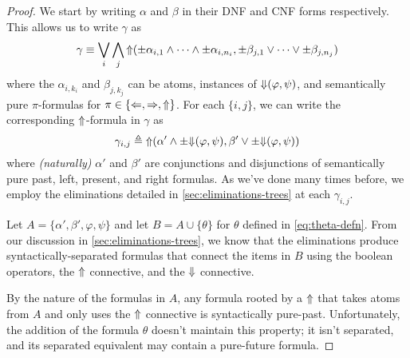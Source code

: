 \documentclass[a4paper,UKenglish,cleveref, autoref, thm-restate, numberwithinsect]{lipics-v2021}
\def\Larrow{\ensuremath\mathord{\Leftarrow}}
\def\Rarrow{\ensuremath\mathord{\Rightarrow}}
\def\Uarrow{\ensuremath\mathord{\Uparrow}}
\def\Darrow{\ensuremath\mathord{\Downarrow}}
\begin{document}
\begin{proof}
    We start by writing $\alpha$ and $\beta$ in their DNF and CNF forms respectively. This allows us to write $\gamma$ as
    \begin{equation*}
        \gamma \equiv \bigvee_i \bigwedge_j \Uarrow( \pm \alpha_{i, 1} \land \cdots \land \pm \alpha_{i, n_i}, \pm \beta_{j, 1} \lor \cdots \lor \pm \beta_{j, n_j})
    \end{equation*}
    where the $\alpha_{i, k_i}$ and $\beta_{j, k_j}$ can be atoms, instances of $\Darrow(\varphi, \psi)$, and semantically pure $\pi$-formulas for $\pi \in \{\Larrow, \Rarrow, \Uarrow\}$. For each $\{i, j\}$, we can write the corresponding $\Uarrow$-formula in $\gamma$ as
    \begin{equation*}
        \gamma_{i, j} \triangleq \Uarrow(\alpha' \land \pm \Darrow(\varphi, \psi), \beta' \lor \pm \Darrow(\varphi, \psi))
    \end{equation*}
    where \textit{(naturally)} $\alpha'$ and $\beta'$ are conjunctions and disjunctions of semantically pure past, left, present, and right formulas. As we've done many times before, we employ the eliminations detailed in \cref{sec:eliminations-trees} at each $\gamma_{i, j}$.

    Let $A = \{\alpha', \beta', \varphi, \psi\}$ and let $B = A \cup \{\theta\}$ for $\theta$ defined in \cref{eq:theta-defn}. From our discussion in \cref{sec:eliminations-trees}, we know that the eliminations produce syntactically-separated formulas that connect the items in $B$ using the boolean operators, the $\Uarrow$ connective, and the $\Darrow$ connective.

    By the nature of the formulas in $A$, any formula rooted by a $\Uarrow$ that takes atoms from $A$ and only uses the $\Uarrow$ connective is syntactically pure-past. Unfortunately, the addition of the formula $\theta$ doesn't maintain this property; it isn't separated, and its separated equivalent may contain a pure-future formula.


\end{proof}
\end{document}
